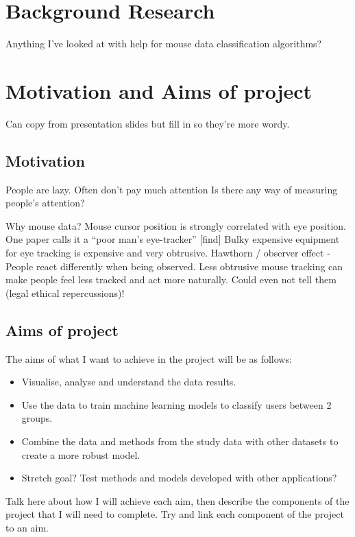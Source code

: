 \documentclass{article}
\begin{document}
\section{Background Research}
Anything I've looked at with help for mouse data classification algorithms? 


\section{Motivation and Aims of project}
Can copy from presentation slides but fill in so they're more wordy.

\subsection{Motivation}

People are lazy. 
Often don't pay much attention 
Is there any way of measuring people's attention?

Why mouse data?
Mouse cursor position is strongly correlated with eye position. 
One paper calls it a “poor man's eye-tracker” [find]
Bulky expensive equipment for eye tracking is expensive and very obtrusive.
Hawthorn / observer effect - People react differently when being observed. 
Less obtrusive mouse tracking can make people feel less tracked and act more naturally. 
Could even not tell them (legal ethical repercussions)!

\subsection{Aims of project}

The aims of what I want to achieve in the project will be as follows:
\begin{itemize}
    \item Visualise, analyse and understand the data results.
    \item Use the data to train machine learning models to classify users between 2 groups.
    \item Combine the data and methods from the study data with other datasets to create a more robust model.
    \item Stretch goal? Test methods and models developed with other applications?
\end{itemize}

Talk here about how I will achieve each aim, then describe the components of the project that I will need to complete.
Try and link each component of the project to an aim.
\end{document}
